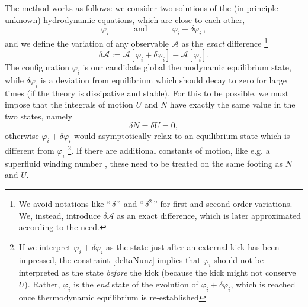 \documentclass[a4paper, amsfonts, amssymb, amsmath, reprint, showkeys, nofootinbib, twoside, onecolumn,notitlepage]{revtex4-1}
\newcommand{\spc}{\quad \quad \quad}
\begin{document}
The method works as follows: we consider two solutions of the (in principle unknown) hydrodynamic equations, which are close to each other,
\begin{equation}
\varphi_i  \spc \text{and}  \spc \varphi_i + \delta \varphi_i \, ,
\end{equation}
and we define the variation of any observable $\mathcal{A}$ as the \textit{exact} difference \footnote{We avoid notations like ``$\, \delta \,$'' and ``$\, \delta^2 \,$'' for first and second order variations. We, instead, introduce $\delta \mathcal{A}$ as an exact difference, which is later approximated according to the need.}
\begin{equation}
\delta \mathcal{A} := \mathcal{A}[\varphi_i+\delta \varphi_i] - \mathcal{A}[\varphi_i].
\end{equation}
The configuration $\varphi_i$ is our candidate global thermodynamic equilibrium state, while $\delta \varphi_i$ is a deviation from equilibrium which should decay to zero for large times (if the theory is dissipative and stable). For this to be possible, we must impose that the integrals of motion $U$ and $N$ have exactly the same value in the two states, namely
\begin{equation}\label{deltaNunz}
\delta N = \delta U =0,
\end{equation}  
otherwise $\varphi_i + \delta \varphi_i$ would asymptotically relax to an equilibrium state which is different from $\varphi_i$ \footnote{If we interpret $\varphi_i + \delta \varphi_i$ as the state just after an external kick has been impressed, the constraint \eqref{deltaNunz} implies that $\varphi_i$ should not be interpreted as the state \textit{before} the kick (because the kick might not conserve $U$). Rather, $\varphi_i$ is the \textit{end} state of the evolution of $\varphi_i + \delta \varphi_i$, which is reached once thermodynamic equilibrium is re-established}. 
If there are additional constants of motion, like e.g. a superfluid winding number \cite{Termo}, these need to be treated on the same footing as $N$ and $U$. 
\end{document}
